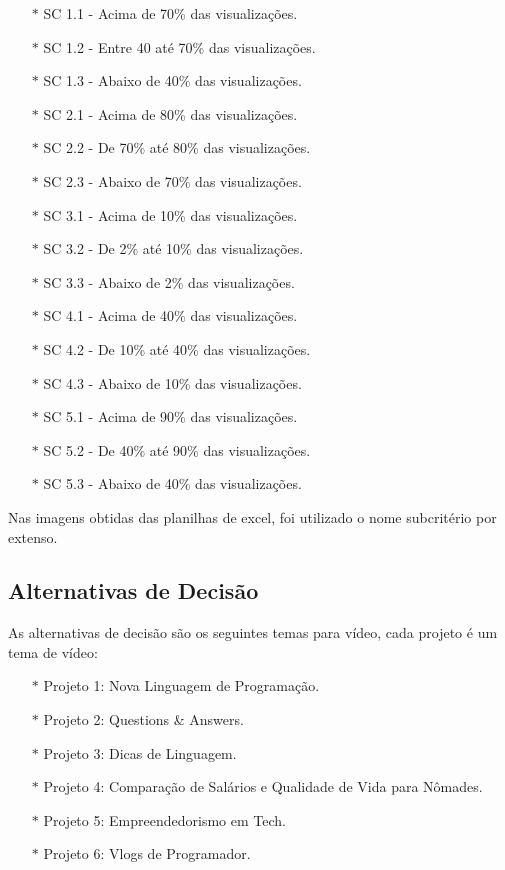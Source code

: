 \documentclass[onecolumn,11pt]{asme2ej}
\begin{document}
\begin{itemize}

    \item[$*$] SC 1.1 - Acima de 70\% das visualizações.
    \item[$*$] SC 1.2 - Entre 40 até 70\% das visualizações.
    \item[$*$] SC 1.3 - Abaixo de 40\% das visualizações.
    
    \item[$*$] SC 2.1 - Acima de 80\% das visualizações.
    \item[$*$] SC 2.2 - De 70\% até 80\% das visualizações.
    \item[$*$] SC 2.3 - Abaixo de 70\% das visualizações.
    
    \item[$*$] SC 3.1 - Acima de 10\% das visualizações.
    \item[$*$] SC 3.2 - De 2\% até 10\% das visualizações.
    \item[$*$] SC 3.3 - Abaixo de 2\% das visualizações.
    
    \item[$*$] SC 4.1 - Acima de 40\% das visualizações.
    \item[$*$] SC 4.2 - De 10\% até 40\% das visualizações.
    \item[$*$] SC 4.3 - Abaixo de 10\% das visualizações.
    
    \item[$*$] SC 5.1 - Acima de 90\% das visualizações.
    \item[$*$] SC 5.2 - De 40\% até 90\% das visualizações.
    \item[$*$] SC 5.3 - Abaixo de 40\% das visualizações.

\end{itemize}

Nas imagens obtidas das planilhas de excel, foi utilizado o nome subcritério por extenso.

\subsection{Alternativas de Decisão}

As alternativas de decisão são os seguintes temas para vídeo, cada projeto é um tema de vídeo:

\begin{itemize}
    \item[$*$] Projeto 1: Nova Linguagem de Programação.
    \item[$*$] Projeto 2: Questions \& Answers.
    \item[$*$] Projeto 3: Dicas de Linguagem.
    \item[$*$] Projeto 4: Comparação de Salários e Qualidade de Vida para Nômades.
    \item[$*$] Projeto 5: Empreendedorismo em Tech.
    \item[$*$] Projeto 6: Vlogs de Programador.
\end{itemize}
\end{document}
